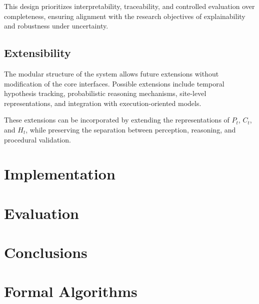 \documentclass[11pt,titlepage,openright]{book}
\begin{document}
This design prioritizes interpretability, traceability, and controlled evaluation over completeness, ensuring alignment with the research objectives of explainability and robustness under uncertainty.

\section{Extensibility}

The modular structure of the system allows future extensions without modification of the core interfaces. Possible extensions include temporal hypothesis tracking, probabilistic reasoning mechanisms, site-level representations, and integration with execution-oriented models.

These extensions can be incorporated by extending the representations of $P_t$, $C_t$, and $H_t$, while preserving the separation between perception, reasoning, and procedural validation.



\chapter{Implementation}
\label{cha:implementation}


\chapter{Evaluation}
\label{cha:evaluation}


\chapter{Conclusions}
\label{cha:conclusions}





\appendix
\chapter{Formal Algorithms}
\end{document}
